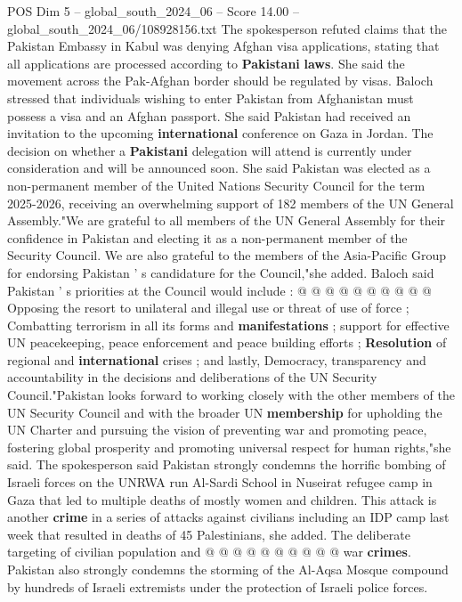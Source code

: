 \begin{textsample}{POS Dim 5 – global\_south\_2024\_06 – Score 14.00 – global\_south\_2024\_06/108928156.txt}  \label{ex:f5_pos_226}
The spokesperson refuted claims that the Pakistan Embassy in Kabul was denying Afghan visa applications, stating that all applications are processed according to \textbf{Pakistani} \textbf{laws}.
She said the movement across the Pak-Afghan border should be regulated by visas.
Baloch stressed that individuals wishing to enter Pakistan from Afghanistan must possess a visa and an Afghan passport.
She said Pakistan had received an invitation to the upcoming \textbf{international} conference on Gaza in Jordan.
The decision on whether a \textbf{Pakistani} delegation will attend is currently under consideration and will be announced soon.
She said Pakistan was elected as a non-permanent member of the United Nations Security Council for the term 2025-2026, receiving an overwhelming support of 182 members of the UN General Assembly."We are grateful to all members of the UN General Assembly for their confidence in Pakistan and electing it as a non-permanent member of the Security Council.
We are also grateful to the members of the Asia-Pacific Group for endorsing Pakistan ' s candidature for the Council,"she added.
Baloch said Pakistan ' s priorities at the Council would include : @ @ @ @ @ @ @ @ @ @ Opposing the resort to unilateral and illegal use or threat of use of force ; Combatting terrorism in all its forms and \textbf{manifestations} ; support for effective UN peacekeeping, peace enforcement and peace building efforts ; \textbf{Resolution} of regional and \textbf{international} crises ; and lastly, Democracy, transparency and accountability in the decisions and deliberations of the UN Security Council."Pakistan looks forward to working closely with the other members of the UN Security Council and with the broader UN \textbf{membership} for upholding the UN Charter and pursuing the vision of preventing war and promoting peace, fostering global prosperity and promoting universal respect for human rights,"she said.
The spokesperson said Pakistan strongly condemns the horrific bombing of Israeli forces on the UNRWA run Al-Sardi School in Nuseirat refugee camp in Gaza that led to multiple deaths of mostly women and children.
This attack is another \textbf{crime} in a series of attacks against civilians including an IDP camp last week that resulted in deaths of 45 Palestinians, she added.
The deliberate targeting of civilian population and @ @ @ @ @ @ @ @ @ @ war \textbf{crimes}.
Pakistan also strongly condemns the storming of the Al-Aqsa Mosque compound by hundreds of Israeli extremists under the protection of Israeli police forces.

\end{textsample}

